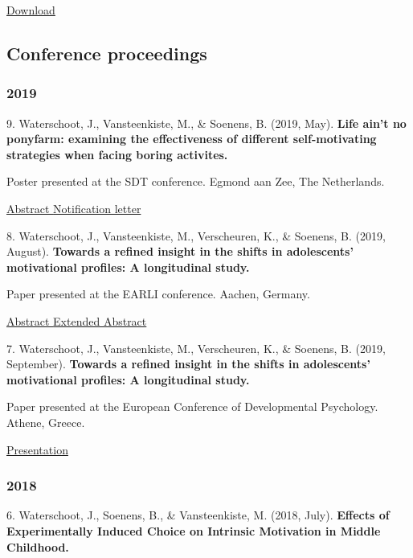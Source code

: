 \documentclass[
]{article}
\begin{document}
\href{download/barometer_material/1.\%20Methodology.pdf}{Download }

\hypertarget{conference-proceedings}{%
\subsection{Conference proceedings}\label{conference-proceedings}}

\hypertarget{section-4}{%
\subsubsection{2019}\label{section-4}}

9. Waterschoot, J., Vansteenkiste, M., \& Soenens, B. (2019, May).
\textbf{Life ain't no ponyfarm: examining the effectiveness of different
self-motivating strategies when facing boring activites.}

Poster presented at the SDT conference. Egmond aan Zee, The Netherlands.

\href{download/presentations/Abstract_SDT_2019.docx}{Abstract }
\textbar{}
\href{download/presentations/Notification\%20letter\%20SDT\%202019.pdf}{Notification
letter }

8. Waterschoot, J., Vansteenkiste, M., Verscheuren, K., \& Soenens, B.
(2019, August). \textbf{Towards a refined insight in the shifts in
adolescents' motivational profiles: A longitudinal study.}

Paper presented at the EARLI conference. Aachen, Germany.

\href{download/presentations/Abstract_EARLI_final_ed.pdf}{Abstract }
\textbar{}
\href{download/presentations/Abstract_EARLI_extended.pdf}{Extended
Abstract }

7. Waterschoot, J., Vansteenkiste, M., Verscheuren, K., \& Soenens, B.
(2019, September). \textbf{Towards a refined insight in the shifts in
adolescents' motivational profiles: A longitudinal study.}

Paper presented at the European Conference of Developmental Psychology.
Athene, Greece.

\href{download/presentations/Presentation_EARA18_Resilience.key}{Presentation
}

\hypertarget{section-5}{%
\subsubsection{2018}\label{section-5}}

6. Waterschoot, J., Soenens, B., \& Vansteenkiste, M. (2018, July).
\textbf{Effects of Experimentally Induced Choice on Intrinsic Motivation
in Middle Childhood.}
\end{document}

